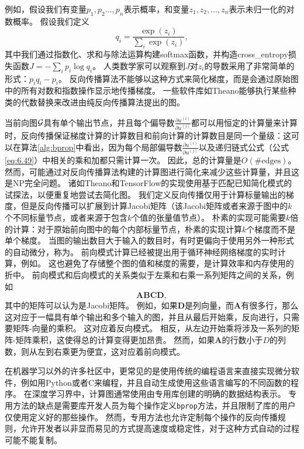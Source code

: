 例如，假设我们有变量$p_1,p_2\ldots,p_n$表示概率，和变量$z_1,z_2,\ldots,z_n$表示未归一化的对数概率。
假设我们定义
\begin{equation}
  q_i = \frac{\exp(z_i)}{\sum_i \exp(z_i)},
\end{equation}
其中我们通过指数化、求和与除法运算构建softmax函数，并构造\gls{cross_entropy}损失函数$J=-\sum_i p_i\log q_i$。
人类数学家可以观察到$J$对$z_i$的导数采用了非常简单的形式：$p_iq_i-p_i$。
反向传播算法不能够以这种方式来简化梯度，而是会通过原始图中的所有对数和指数操作显示地传播梯度。
一些软件库如Theano\citep{bergstra+al:2010-scipy-small,Bastien-Theano-2012}能够执行某些种类的代数替换来改进由纯反向传播算法提出的图。
  
  
当前向图$\mathcal{G}$具有单个输出节点，并且每个偏导数$\frac{\partial u^{(i)}}{\partial u^{(j)}}$都可以用恒定的计算量来计算时，反向传播保证梯度计算的计算数目和前向计算的计算数目是同一个量级：这可以在算法\ref{alg:bprop}中看出，因为每个局部偏导数$\frac{\partial u^{(i)}}{\partial u^{(j)}}$以及递归链式公式（公式\ref{eq:6.49}）中相关的乘和加都只需计算一次。
因此，总的计算量是$O(\#\text{edges})$。
然而，可能通过对反向传播算法构建的计算图进行简化来减少这些计算量，并且这是NP完全问题。
诸如Theano和TensorFlow的实现使用基于匹配已知简化模式的试探法，以便重复地尝试去简化图。
我们定义反向传播仅用于计算标量输出的梯度，但是反向传播可以扩展到计算Jacobi矩阵（该Jacobi矩阵或者来源于图中的$k$个不同标量节点，或者来源于包含$k$个值的张量值节点）。
朴素的实现可能需要$k$倍的计算：对于原始前向图中的每个内部标量节点，朴素的实现计算$k$个梯度而不是单个梯度。
当图的输出数目大于输入的数目时，有时更偏向于使用另外一种形式的自动微分，称为。
前向模式计算已经被提出用于循环神经网络梯度的实时计算，例如\citep{Williams89b}。
这也避免了存储整个图的值和梯度的需要，是计算效率和内存使用的折中。
前向模式和后向模式的关系类似于左乘和右乘一系列矩阵之间的关系，例如
\begin{equation}
  \bm{ABCD},
\end{equation}
其中的矩阵可以认为是Jacobi矩阵。
例如，如果$\bm{D}$是列向量，而$\bm{A}$有很多行，那么这对应于一幅具有单个输出和多个输入的图，并且从最后开始乘，反向进行，只需要矩阵-向量的乘积。
这对应着反向模式。
相反，从左边开始乘将涉及一系列的矩阵-矩阵乘积，这使得总的计算变得更加昂贵。
然而，如果$\bm{A}$的行数小于$D$的列数，则从左到右乘更为便宜，这对应着前向模式。

在机器学习以外的许多社区中，更常见的是使用传统的编程语言来直接实现微分软件，例如用Python或者C来编程，并且自动生成使用这些语言编写的不同函数的程序。
在深度学习界中，计算图通常使用由专用库创建的明确的数据结构表示。
专用方法的缺点是需要库开发人员为每个操作定义\verb|bprop|方法，并且限制了库的用户仅使用定义好的那些操作。
然而，专用方法也允许定制每个操作的反向传播规则，允许开发者以非显而易见的方式提高速度或稳定性，对于这种方式自动的过程可能不能复制。

